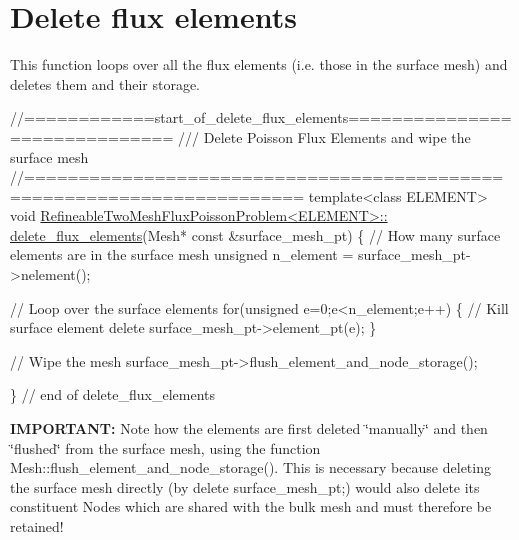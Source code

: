  

\hypertarget{index_delete_flux}{}\section{Delete flux elements}\label{index_delete_flux}
This function loops over all the flux elements (i.\+e. those in the surface mesh) and deletes them and their storage.

 
\begin{DoxyCodeInclude}
\textcolor{comment}{//============start\_of\_delete\_flux\_elements==============================}
\textcolor{comment}{/// Delete Poisson Flux Elements and wipe the surface mesh}
\textcolor{comment}{}\textcolor{comment}{//=======================================================================}
\textcolor{keyword}{template}<\textcolor{keyword}{class} ELEMENT>
\textcolor{keywordtype}{void} \hyperlink{classRefineableTwoMeshFluxPoissonProblem_ab35087cadc6dbc7a602441b9a986d650}{RefineableTwoMeshFluxPoissonProblem<ELEMENT>::}
\hyperlink{classRefineableTwoMeshFluxPoissonProblem_ab35087cadc6dbc7a602441b9a986d650}{delete\_flux\_elements}(Mesh* \textcolor{keyword}{const} &surface\_mesh\_pt)
\{
 \textcolor{comment}{// How many surface elements are in the surface mesh}
 \textcolor{keywordtype}{unsigned} n\_element = surface\_mesh\_pt->nelement();

 \textcolor{comment}{// Loop over the surface elements}
 \textcolor{keywordflow}{for}(\textcolor{keywordtype}{unsigned} e=0;e<n\_element;e++)
  \{
   \textcolor{comment}{// Kill surface element}
   \textcolor{keyword}{delete} surface\_mesh\_pt->element\_pt(e);
  \}

 \textcolor{comment}{// Wipe the mesh}
 surface\_mesh\_pt->flush\_element\_and\_node\_storage();

\} \textcolor{comment}{// end of delete\_flux\_elements}

\end{DoxyCodeInclude}


{\bfseries I\+M\+P\+O\+R\+T\+A\+NT\+:} Note how the elements are first deleted \char`\"{}manually\char`\"{} and then \char`\"{}flushed\char`\"{} from the surface mesh, using the function {\ttfamily Mesh\+::flush\+\_\+element\+\_\+and\+\_\+node\+\_\+storage()}. This is necessary because deleting the surface mesh directly (by {\ttfamily delete} {\ttfamily surface\+\_\+mesh\+\_\+pt};) would also delete its constituent {\ttfamily Nodes} which are shared with the bulk mesh and must therefore be retained!



